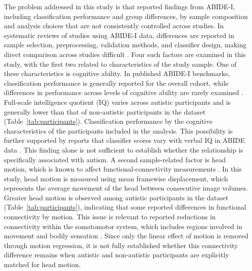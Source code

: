 The problem addressed in this study is that reported findings from ABIDE-I, including classification performance and group differences,  by sample composition and analysis choices that are not consistently controlled across studies. In systematic reviews of studies using ABIDE-I data, differences are reported in sample selection, preprocessing, validation methods, and classifier design, making direct comparison across studies difficult \citep{Santanaetal2022,Hudaetal2024}. Four such factors are examined in this study, with the first two related to characteristics of the study sample. One of these characteristics is cognitive ability. In published ABIDE-I benchmarks, classification performance is generally reported for the overall cohort, while differences in performance across levels of cognitive ability are rarely examined \citep{Heinsfeldetal2018,Eslamietal2019,AlmuqhimSaeed2021}. Full-scale intelligence quotient (IQ) varies across autistic participants and is generally lower than that of non-autistic participants in the dataset (Table~\ref{tab:participants}). Classification performance  by the cognitive characteristics of the participants included in the analysis. This possibility is further supported by reports that classifier scores vary with verbal IQ in ABIDE data \citep{Nielsenetal2013}. This finding alone is not sufficient to establish whether the relationship is specifically associated with autism. A second sample-related factor is head motion, which is known to affect functional-connectivity measurements \citep{Poweretal2012}. In this study, head motion is measured using mean framewise displacement, which represents the average movement of the head between consecutive image volumes. Greater head motion is observed among autistic participants in the dataset (Table~\ref{tab:participants}), indicating that some reported differences in functional connectivity  by motion. This issue is relevant to reported reductions in connectivity within the somatomotor system, which includes regions involved in movement and bodily sensation \citep{Holigaetal2019,Ilioskaetal2023}. Since only the linear effect of motion is removed through motion regression, it is not fully established whether this connectivity difference remains when autistic and non-autistic participants are explicitly matched for head motion.


